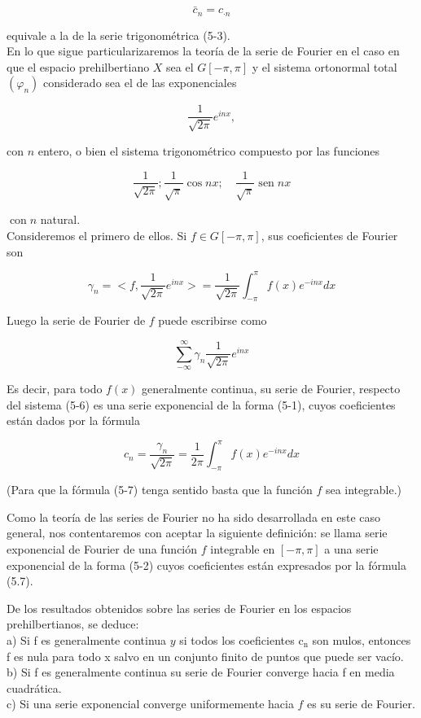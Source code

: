 \documentclass[10pt]{article}
\theoremstyle{plain}
\theoremstyle{definition}
\theoremstyle{remark}
\begin{document}
$$
\bar{c}_{n}=c_{\cdot n}
$$

equivale a la de la serie trigonométrica (5-3).\\
En lo que sigue particularizaremos la teoría de la serie de Fourier en el caso en que el espacio prehilbertiano $X$ sea el $G[-\pi, \pi]$ y el sistema ortonormal total $\left(\varphi_{n}\right)$ considerado sea el de las exponenciales


\begin{equation*}
\frac{1}{\sqrt{2 \pi}} e^{i n x}, \tag{5-6}
\end{equation*}


con $n$ entero, o bien el sistema trigonométrico compuesto por las funciones

$$
\frac{1}{\sqrt{2 \pi}} ; \frac{1}{\sqrt{\pi}} \cos n x ; \quad \frac{1}{\sqrt{\pi}} \operatorname{sen} n x
$$

$\operatorname{con} n$ natural.\\
Consideremos el primero de ellos. Si $f \in G[-\pi, \pi]$, sus coeficientes de Fourier son

$$
\gamma_{n}=<f, \frac{1}{\sqrt{2 \pi}} e^{i n x}>=\frac{1}{\sqrt{2 \pi}} \int_{-\pi}^{\pi} f(x) e^{-i n x} d x
$$

Luego la serie de Fourier de $f$ puede escribirse como

$$
\sum_{-\infty}^{\infty} \gamma_{n} \frac{1}{\sqrt{2 \pi}} e^{i n x}
$$

Es decir, para todo $f(x)$ generalmente continua, su serie de Fourier, respecto del sistema (5-6) es una serie exponencial de la forma (5-1), cuyos coeficientes están dados por la fórmula


\begin{equation*}
c_{n}=\frac{\gamma_{n}}{\sqrt{2 \pi}}=\frac{1}{2 \pi} \int_{-\pi}^{\pi} f(x) e^{-i n x} d x \tag{5-7}
\end{equation*}



(Para que la fórmula (5-7) tenga sentido basta que la función $f$ sea integrable.)

Como la teoría de las series de Fourier no ha sido desarrollada en este caso general, nos contentaremos con aceptar la siguiente definición: se llama serie exponencial de Fourier de una función $f$ integrable en $[-\pi, \pi]$ a una serie exponencial de la forma (5-2) cuyos coeficientes están expresados por la fórmula (5.7).

De los resultados obtenidos sobre las series de Fourier en los espacios prehilbertianos, se deduce:\\
a) Si f es generalmente continua $y$ si todos los coeficientes $\mathrm{c}_{\mathrm{n}}$ son mulos, entonces f es nula para todo x salvo en un conjunto finito de puntos que puede ser vacío.\\
b) Si f es generalmente continua su serie de Fourier converge hacia f en media cuadrática.\\
c) Si una serie exponencial converge uniformemente hacia $f$ es su serie de Fourier.
\end{document}
